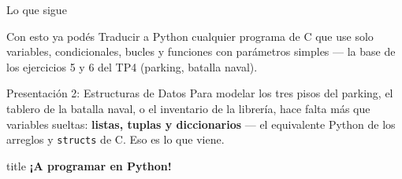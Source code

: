 \documentclass{beamer}
\begin{document}
\begin{frame}{Lo que sigue}
  \begin{block}{Con esto ya podés}
    Traducir a Python cualquier programa de C que use solo variables,
    condicionales, bucles y funciones con parámetros simples — la base de
    los ejercicios 5 y 6 del TP4 (parking, batalla naval).
  \end{block}
  \begin{alertblock}{Presentación 2: Estructuras de Datos}
    Para modelar los tres pisos del parking, el tablero de la batalla
    naval, o el inventario de la librería, hace falta más que variables
    sueltas: \textbf{listas, tuplas y diccionarios} — el equivalente
    Python de los arreglos y \texttt{structs} de C. Eso es lo que viene.
  \end{alertblock}
\end{frame}

\begin{frame}
  \vfill
  \centering
  \begin{beamercolorbox}[sep=8pt,center,shadow=true,rounded=true]{title}
    \Huge \bfseries ¡A programar en Python!
  \end{beamercolorbox}
  \vfill
\end{frame}
\end{document}
